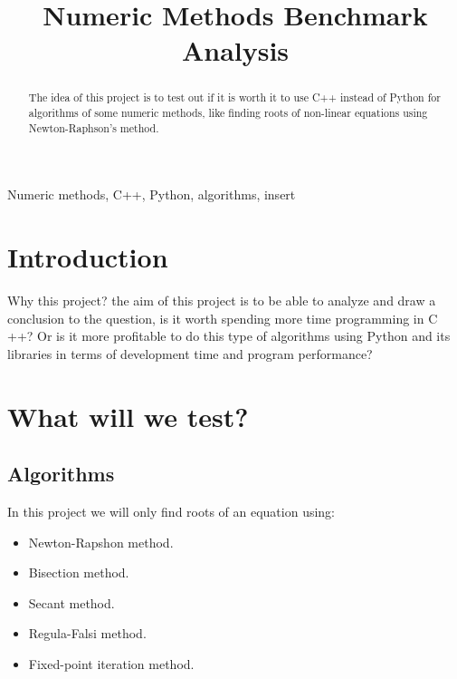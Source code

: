 \documentclass[conference]{IEEEtran}
\begin{document}
\title{Numeric Methods Benchmark Analysis}

\author{
\and
{}
}

\maketitle

\begin{abstract}
The idea of this project is to test out if it is worth it to use C++ instead of Python for
algorithms of some numeric methods, like finding roots of non-linear equations using
Newton-Raphson's method.
\end{abstract}

\begin{IEEEkeywords}
Numeric methods, C++, Python, algorithms, insert
\end{IEEEkeywords}

\section{Introduction}
Why this project? the aim of this project is to be able to analyze and draw a conclusion to 
the question, is it worth spending more time programming in C ++? Or is it more profitable to do 
this type of algorithms using Python and its libraries in terms of development time and program performance?

\section{What will we test?}

\subsection{Algorithms}
In this project we will only find roots of an equation using:
\begin{itemize}
    \item Newton-Rapshon method.
    \item Bisection method.
    \item Secant method.
    \item Regula-Falsi method.
    \item Fixed-point iteration method.
\end{itemize}
\end{document}
